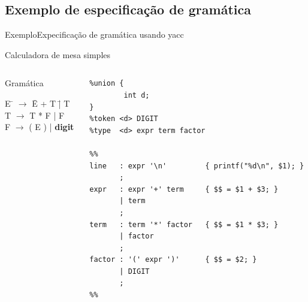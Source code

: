 \subsection{Exemplo de especificação de gramática}

\frame{\tableofcontents[currentsubsection]}

\begin{frame}[fragile]{Exemplo}{Expecificação de gramática usando yacc}

  {\hfil\color{gray} Calculadora de mesa simples}\bigskip

  \begin{columns}
    \begin{column}{.35\textwidth}
      \begin{block}{Gramática}
        \begin{tabbing}
          E \= $\rightarrow$ \= E + T \= | T \\
          T \> $\rightarrow$ \> T * F \> | F\\
          F \> $\rightarrow$ \> ( E ) \> | {\bf digit}\\
        \end{tabbing}
      \end{block}
    \end{column}
    \scriptsize
    \pause
    \begin{column}{.65\textwidth}
      \begin{lstlisting}
%union {
        int d;
}
%token <d> DIGIT
%type  <d> expr term factor

%%
line   : expr '\n'         { printf("%d\n", $1); }
       ;
expr   : expr '+' term     { $$ = $1 + $3; }
       | term
       ;
term   : term '*' factor   { $$ = $1 * $3; }
       | factor
       ;
factor : '(' expr ')'      { $$ = $2; }
       | DIGIT
       ;
%%
      \end{lstlisting}
    \end{column}
  \end{columns}
\end{frame}

